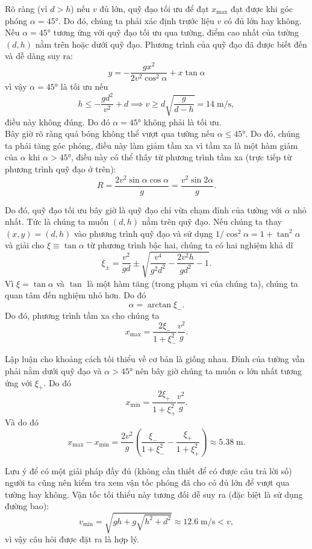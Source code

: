 \begin{solution}
Rõ ràng (vì $d>h$) nếu $v$ đủ lớn, quỹ đạo tối ưu để đạt $x_{\max}$ đạt được khi góc phóng $\alpha=\ang{45}$. Do đó, chúng ta phải xác định trước liệu $v$ có đủ lớn hay không.\\

Nếu $\alpha=\ang{45}$ tương ứng với quỹ đạo tối ưu qua tường, điểm cao nhất của tường $(d,h)$ nằm trên hoặc dưới quỹ đạo. Phương trình của quỹ đạo đã được biết đến và dễ dàng suy ra:
\[y=-\frac{gx^2}{2v^2\cos^2\alpha}+x\tan\alpha\]
vì vậy $\alpha=\ang{45}$ là tối ưu nếu
\[h\leq -\frac{gd^2}{v^2}+d \implies v\geq d\sqrt{\frac{g}{d-h}}=14\;\mathrm{m/s},\]
điều này không đúng. Do đó $\alpha=\ang{45}$ không phải là tối ưu.\\

Bây giờ rõ ràng quả bóng không thể vượt qua tường nếu $\alpha\leq\ang{45}$. Do đó, chúng ta phải tăng góc phóng, điều này làm giảm tầm xa vì tầm xa là một hàm giảm của $\alpha$ khi $\alpha>\ang{45}$, điều này có thể thấy từ phương trình tầm xa (trực tiếp từ phương trình quỹ đạo ở trên):
\[R=\frac{2v^2\sin\alpha\cos\alpha}{g}=\frac{v^2\sin2\alpha}{g}.\]

Do đó, quỹ đạo tối ưu bây giờ là quỹ đạo chỉ vừa chạm đỉnh của tường với $\alpha$ nhỏ nhất. Tức là chúng ta muốn $(d,h)$ nằm trên quỹ đạo. Nếu chúng ta thay $(x,y)=(d,h)$ vào phương trình quỹ đạo và sử dụng $1/\cos^2\alpha=1+\tan^2\alpha$ và giải cho $\xi\equiv\tan\alpha$ từ phương trình bậc hai, chúng ta có hai nghiệm khả dĩ
\[\xi_{\pm}=\frac{v^2}{gd}\pm\sqrt{\frac{v^4}{g^2d^2}-\frac{2v^2h}{gd^2}-1}.\]
Vì $\xi=\tan\alpha$ và $\tan$ là một hàm tăng (trong phạm vi của chúng ta), chúng ta quan tâm đến nghiệm nhỏ hơn. Do đó
\[\alpha=\arctan{\xi_-}.\]
Do đó, phương trình tầm xa cho chúng ta
\[x_{\max}=\frac{2\xi_-}{1+\xi_-^2}\frac{v^2}{g}.\]

Lập luận cho khoảng cách tối thiểu về cơ bản là giống nhau. Đỉnh của tường vẫn phải nằm dưới quỹ đạo và $\alpha>\ang{45}$ nên bây giờ chúng ta muốn $\alpha$ lớn nhất tương ứng với $\xi_+.$ Do đó
\[x_{\min}=\frac{2\xi_+}{1+\xi_+^2}\frac{v^2}{g}.\]
Và do đó
\[x_{\max}-x_{\min}=\frac{2v^2}{g}\left(\frac{\xi_-}{1+\xi_-^2}-\frac{\xi_+}{1+\xi_+^2}\right)\approx\boxed{5.38\;\mathrm{m}}.\]

Lưu ý để có một giải pháp đầy đủ (không cần thiết để có được câu trả lời số) người ta cũng nên kiểm tra xem vận tốc phóng đã cho có đủ lớn để vượt qua tường hay không. Vận tốc tối thiểu này tương đối dễ suy ra (đặc biệt là sử dụng đường bao):
\[v_{\min}=\sqrt{gh+g\sqrt{h^2+d^2}}\approx{12.6}\;\mathrm{m/s}<v,\]
vì vậy câu hỏi được đặt ra là hợp lý.
\end{solution}
